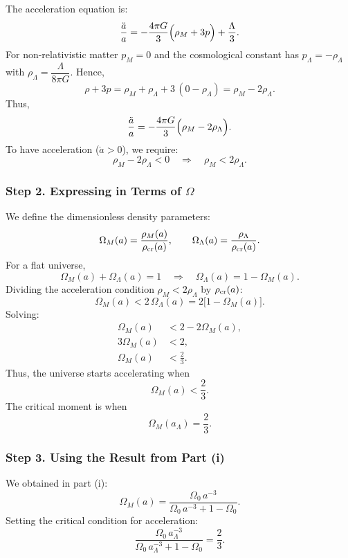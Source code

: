 \documentclass{article}
\begin{document}
The acceleration equation is:
\[
\frac{\ddot{a}}{a} = -\frac{4\pi G}{3}\Bigl( \rho_M + 3p \Bigr) + \frac{\Lambda}{3}.
\]
For non-relativistic matter \(p_M = 0\) and the cosmological constant has \(p_\Lambda = -\rho_\Lambda\) with \(\rho_\Lambda = \dfrac{\Lambda}{8\pi G}\). Hence,
\[
\rho + 3p = \rho_M + \rho_\Lambda + 3\,(0 - \rho_\Lambda) = \rho_M - 2\rho_\Lambda.
\]
Thus,
\[
\frac{\ddot{a}}{a} = -\frac{4\pi G}{3}\Bigl( \rho_M - 2\rho_\Lambda \Bigr).
\]
To have acceleration (\(\ddot{a}>0\)), we require:
\[
\rho_M - 2\rho_\Lambda < 0 \quad \Longrightarrow \quad \rho_M < 2\rho_\Lambda.
\]

\subsubsection*{Step 2. Expressing in Terms of \(\Omega\)}

We define the dimensionless density parameters:
\[
\Omega_M(a) = \frac{\rho_M(a)}{\rho_{\rm cr}(a)}, \qquad \Omega_\Lambda(a) = \frac{\rho_\Lambda}{\rho_{\rm cr}(a)}.
\]
For a flat universe,
\[
\Omega_M(a) + \Omega_\Lambda(a) = 1 \quad \Longrightarrow \quad \Omega_\Lambda(a)=1-\Omega_M(a).
\]
Dividing the acceleration condition \(\rho_M < 2\rho_\Lambda\) by \(\rho_{\rm cr}(a)\):
\[
\Omega_M(a) < 2\,\Omega_\Lambda(a) = 2\bigl[1-\Omega_M(a)\bigr].
\]
Solving:
\[
\begin{aligned}
\Omega_M(a) &< 2 - 2\Omega_M(a),\\[1mm]
3\Omega_M(a) &< 2,\\[1mm]
\Omega_M(a) &< \frac{2}{3}.
\end{aligned}
\]
Thus, the universe starts accelerating when
\[
\boxed{\Omega_M(a) < \frac{2}{3}.}
\]
The critical moment is when
\[
\boxed{\Omega_M(a_\Lambda) = \frac{2}{3}.}
\]

\subsubsection*{Step 3. Using the Result from Part (i)}

We obtained in part (i):
\[
\Omega_M(a)= \frac{\Omega_0\,a^{-3}}{\Omega_0\,a^{-3}+1-\Omega_0}.
\]
Setting the critical condition for acceleration:
\[
\frac{\Omega_0\,a_\Lambda^{-3}}{\Omega_0\,a_\Lambda^{-3}+1-\Omega_0} = \frac{2}{3}.
\]
\end{document}
